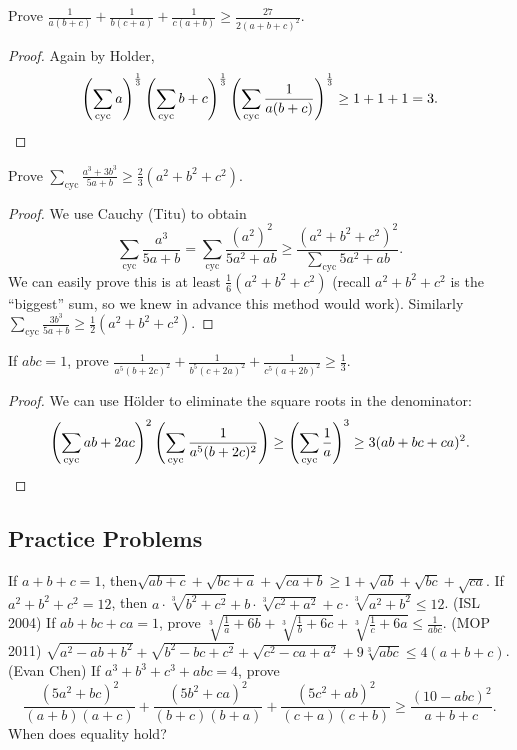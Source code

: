 \documentclass[11pt]{scrartcl}
\begin{document}
\begin{example}
  [Balkan] Prove $\frac{1}{a(b+c)} + \frac{1}{b(c+a)} + \frac{1}{c(a+b)} \ge \frac{27}{2(a+b+c)^2}$.
\end{example}
\begin{proof}
  Again by Holder,
  \[
    \left( \sum_{\text{cyc}} a \right)^{\frac 13}
    \left( \sum_{\text{cyc}} b+c \right)^{\frac 13}
    \left( \sum_{\text{cyc}} \frac{1}{a(b+c)} \right)^{\frac13}
    \ge 1+1+1
    = 3. \qedhere \]
\end{proof}

\begin{example}
  [JMO 2012] Prove $\sum_{\text{cyc}} \frac{a^3+3b^3}{5a+b} \ge \frac 23 \left( a^2+b^2+c^2 \right)$.
\end{example}
\begin{proof}
  We use Cauchy (Titu) to obtain
  \[ \sum_{\text{cyc}} \frac{a^3}{5a+b}  = \sum_{\text{cyc}} \frac{(a^2)^2}{5a^2+ab} \ge \frac{(a^2+b^2+c^2)^2}{\sum_{\text{cyc}} 5a^2+ab}. \]
  We can easily prove this is at least $\frac16 (a^2+b^2+c^2)$
  (recall $a^2+b^2+c^2$ is the ``biggest'' sum,
  so we knew in advance this method would work).
  Similarly $\sum_{\text{cyc}} \frac{3b^3}{5a+b} \ge \frac 12 (a^2+b^2+c^2)$.
\end{proof}

\begin{example}
   If $abc=1$, prove $ \frac{1}{a^5(b+2c)^2}+\frac{1}{b^5(c+2a)^2}+\frac{1}{c^5(a+2b)^2}\ge\frac{1}{3} $.
\end{example}
\begin{proof}
  We can use H\"older to eliminate the square roots in the denominator:
  \[ \left(\sum_{\text{cyc}}ab+2 ac\right)^2\left(\sum_{\text{cyc}}\frac{1}{a^5(b+2c)^2}\right)\ge\left(\sum_{\text{cyc}}\frac{1}{a}\right)^3\ge 3(ab+bc+ca)^2. \qedhere \]
\end{proof}


\subsection{Practice Problems}
\begin{enumerate}
  \ii If $a+b+c=1$, then$\sqrt{ab+c}+\sqrt{bc+a}+\sqrt{ca+b} \ge 1+\sqrt{ab}+\sqrt{bc}+\sqrt{ca}$.
  \ii If $a^2+b^2+c^2=12$, then $a\cdot\sqrt[3]{b^2+c^2}+b\cdot\sqrt[3]{c^2+a^2}+c\cdot\sqrt[3]{a^2+b^2}\leq 12$.
  \ii (ISL 2004) If $ab+bc+ca=1$, prove $ \sqrt[3]{\frac{1}{a}+6b}+\sqrt[3]{\frac{1}{b}+6c}+\sqrt[3]{\frac{1}{c}+6a }\leq\frac{1}{abc}$.
  \ii (MOP 2011) $\sqrt{a^2-ab+b^2}+\sqrt{b^2-bc+c^2} + \sqrt{c^2-ca+a^2} + 9\sqrt[3]{abc} \le 4(a+b+c)$.
  \ii (Evan Chen) If $a^3+b^3+c^3+abc=4$, prove
  \[ \frac{(5a^2+bc)^2}{(a+b)(a+c)}+\frac{(5b^2+ca)^2}{(b+c)(b+a)}+\frac{(5c^2+ab)^2}{(c+a)(c+b)}\ge\frac{(10-abc)^2}{a+b+c}. \]
  When does equality hold?
\end{enumerate}
\end{document}
